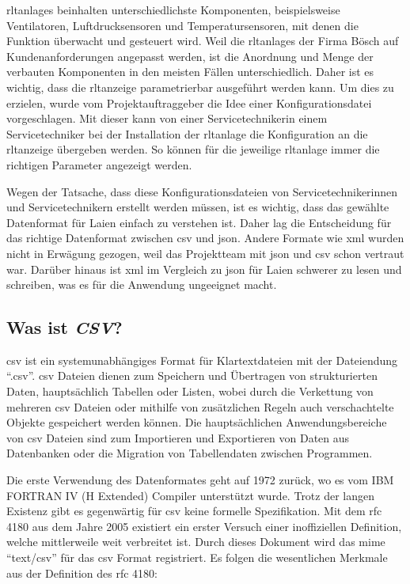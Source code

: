 \acp{rltanlage} beinhalten unterschiedlichste Komponenten, beispielsweise Ventilatoren, Luftdrucksensoren und Temperatursensoren, mit denen die Funktion überwacht und gesteuert wird. Weil die \acp{rltanlage} der Firma Bösch auf Kundenanforderungen angepasst werden, ist die Anordnung und Menge der verbauten Komponenten in den meisten Fällen unterschiedlich. Daher ist es wichtig, dass die \ac{rltanzeige} parametrierbar ausgeführt werden kann. Um dies zu erzielen, wurde vom Projektauftraggeber die Idee einer Konfigurationsdatei vorgeschlagen. Mit dieser kann von einer  Servicetechnikerin \bzw einem Servicetechniker bei der Installation der \ac{rltanlage} die Konfiguration an die \ac{rltanzeige} übergeben werden. So können für die jeweilige \ac{rltanlage} immer die richtigen Parameter angezeigt werden.

Wegen der Tatsache, dass diese Konfigurationsdateien von Servicetechnikerinnen und Servicetechnikern erstellt werden müssen, ist es wichtig, dass das gewählte Datenformat für Laien einfach zu verstehen ist. Daher lag die Entscheidung für das richtige Datenformat zwischen \acf{csv} und \acf{json}. Andere Formate  wie \acf{xml} wurden nicht in Erwägung gezogen, weil das Projektteam mit \ac{json} und \ac{csv} schon vertraut war. Darüber hinaus ist \ac{xml} im Vergleich zu \ac{json} für Laien schwerer zu lesen und schreiben, was es für die Anwendung ungeeignet macht. 

\subsection{Was ist \textit{CSV}?}\label{csv_kapitel}
\acf{csv} ist ein systemunabhängiges Format für Klartextdateien mit der Dateiendung \enquote{.csv}. \ac{csv} Dateien dienen zum Speichern und Übertragen von strukturierten Daten, hauptsächlich Tabellen oder Listen, wobei durch die Verkettung von mehreren \ac{csv} Dateien oder mithilfe von zusätzlichen Regeln auch verschachtelte Objekte gespeichert werden können. Die hauptsächlichen Anwendungsbereiche von \ac{csv} Dateien sind zum Importieren und Exportieren von Daten aus Datenbanken oder die Migration von Tabellendaten zwischen Programmen. \cite[vgl.][]{FuchsMediaSolutions:o.J.}

Die erste Verwendung des Datenformates geht auf 1972 zurück, wo es vom IBM FORTRAN IV (H Extended) Compiler unterstützt wurde. \cite[vgl.][]{IBM:1972} Trotz der langen Existenz gibt es gegenwärtig für \ac{csv} keine formelle Spezifikation. Mit dem \ac{rfc} 4180 \cite[vgl.][]{Shafranovich:2005} aus dem Jahre 2005 existiert ein erster Versuch einer inoffiziellen Definition, welche mittlerweile weit verbreitet ist. Durch dieses Dokument wird das \acf{mime} \enquote{text/csv} für das \ac{csv} Format registriert. Es folgen die wesentlichen Merkmale aus der Definition des \ac{rfc} 4180:

